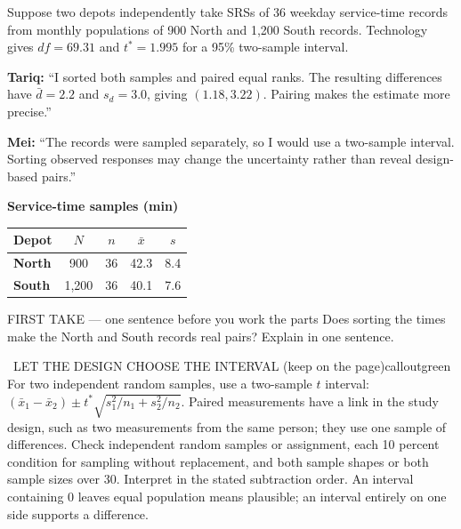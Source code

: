\documentclass[11pt]{article}
\begin{document}


Suppose two depots independently take SRSs of 36 weekday service-time records from monthly populations of 900 North and 1,200 South records. Technology gives $df=69.31$ and $t^*=1.995$ for a 95\% two-sample interval.\par\smallskip \textbf{Tariq:} ``I sorted both samples and paired equal ranks. The resulting differences have $\bar d=2.2$ and $s_d=3.0$, giving $(1.18,3.22)$. Pairing makes the estimate more precise.''\par \textbf{Mei:} ``The records were sampled separately, so I would use a two-sample interval. Sorting observed responses may change the uncertainty rather than reveal design-based pairs.''\par
\begin{center}
\textbf{Service-time samples (min)}\par\smallskip
\begin{tabular}{|l|c|c|c|c|}
\hline
\textbf{Depot} & \textbf{$N$} & \textbf{$n$} & \textbf{$\bar x$} & \textbf{$s$} \\ \hline
\textbf{North} & 900 & 36 & 42.3 & 8.4 \\ \hline
\textbf{South} & 1,200 & 36 & 40.1 & 7.6 \\ \hline
\end{tabular}
\end{center}
\begin{firsttakebox}{FIRST TAKE --- one sentence before you work the parts}
Does sorting the times make the North and South records real pairs? Explain in one sentence.
\workspace{0.9in}
\end{firsttakebox}

\begin{callout}{\IconBook\ LET THE DESIGN CHOOSE THE INTERVAL (keep on the page)}{calloutgreen}
For two independent random samples, use a two-sample $t$ interval:
$(\bar x_1-\bar x_2)\pm t^*\sqrt{s_1^2/n_1+s_2^2/n_2}$. Paired measurements have a link
in the study design, such as two measurements from the same person; they use one sample of differences.
Check independent random samples or assignment, each 10 percent condition for sampling without replacement,
and both sample shapes or both sample sizes over 30. Interpret in the stated subtraction order.
An interval containing 0 leaves equal population means plausible; an interval entirely on one side supports a difference.
\end{callout}
\end{document}
